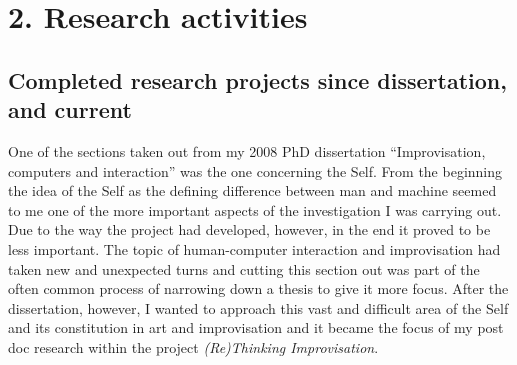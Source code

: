 \documentclass[a4paper]{article}
\begin{document}
\section*{\textsf{2. Research activities}}

\subsection*{\textsf{Completed research projects since dissertation, and current}}

One of the sections taken out from my 2008 PhD dissertation ``Improvisation, computers and interaction'' \citep{frisk08} was the one concerning the Self. From the beginning the idea of the Self as the defining difference between man and machine seemed to me one of the more important aspects of the investigation I was carrying out. Due to the way the project had developed, however, in the end it proved to be less important. The topic of human-computer interaction and improvisation had taken new and unexpected turns and cutting this section out was part of the often common process of narrowing down a thesis to give it more focus. After the dissertation, however, I wanted to approach this vast and difficult area of the Self and its constitution in art and improvisation and it became the focus of my post doc research within the project \emph{(Re)Thinking Improvisation}. 
\end{document}

